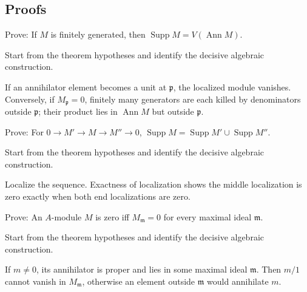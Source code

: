 \subsection*{Proofs}

\begin{exercise}\label{exr:v16-expand-06}
Prove: If $M$ is finitely generated, then $\operatorname{Supp}M=V(\operatorname{Ann}M)$.
\end{exercise}
\begin{hint}
Start from the theorem hypotheses and identify the decisive algebraic construction.
\end{hint}
\begin{solution}
If an annihilator element becomes a unit at $\mathfrak p$, the localized module vanishes. Conversely, if $M_{\mathfrak p}=0$, finitely many generators are each killed by denominators outside $\mathfrak p$; their product lies in $\operatorname{Ann}M$ but outside $\mathfrak p$.
\end{solution}

\begin{exercise}\label{exr:v16-expand-07}
Prove: For $0\to M'\to M\to M''\to0$, $\operatorname{Supp}M=\operatorname{Supp}M'\cup\operatorname{Supp}M''$.
\end{exercise}
\begin{hint}
Start from the theorem hypotheses and identify the decisive algebraic construction.
\end{hint}
\begin{solution}
Localize the sequence. Exactness of localization shows the middle localization is zero exactly when both end localizations are zero.
\end{solution}

\begin{exercise}\label{exr:v16-expand-08}
Prove: An $A$-module $M$ is zero iff $M_{\mathfrak m}=0$ for every maximal ideal $\mathfrak m$.
\end{exercise}
\begin{hint}
Start from the theorem hypotheses and identify the decisive algebraic construction.
\end{hint}
\begin{solution}
If $m\ne0$, its annihilator is proper and lies in some maximal ideal $\mathfrak m$. Then $m/1$ cannot vanish in $M_{\mathfrak m}$, otherwise an element outside $\mathfrak m$ would annihilate $m$.
\end{solution}

